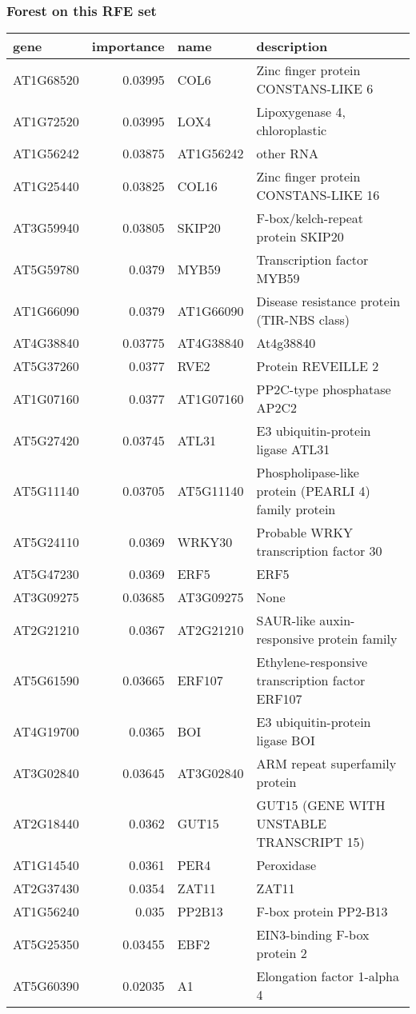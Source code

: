 \documentclass[a4paper]{article}
\begin{document}
\subsubsection{Forest on this RFE set}
\label{sec:org4c0e844}

\begin{center}
\begin{tabular}{lrll}
gene & importance & name & description\\
\hline
AT1G68520 & 0.03995 & COL6 & Zinc finger protein CONSTANS-LIKE 6\\
AT1G72520 & 0.03995 & LOX4 & Lipoxygenase 4, chloroplastic\\
AT1G56242 & 0.03875 & AT1G56242 & other RNA\\
AT1G25440 & 0.03825 & COL16 & Zinc finger protein CONSTANS-LIKE 16\\
AT3G59940 & 0.03805 & SKIP20 & F-box/kelch-repeat protein SKIP20\\
AT5G59780 & 0.0379 & MYB59 & Transcription factor MYB59\\
AT1G66090 & 0.0379 & AT1G66090 & Disease resistance protein (TIR-NBS class)\\
AT4G38840 & 0.03775 & AT4G38840 & At4g38840\\
AT5G37260 & 0.0377 & RVE2 & Protein REVEILLE 2\\
AT1G07160 & 0.0377 & AT1G07160 & PP2C-type phosphatase AP2C2\\
AT5G27420 & 0.03745 & ATL31 & E3 ubiquitin-protein ligase ATL31\\
AT5G11140 & 0.03705 & AT5G11140 & Phospholipase-like protein (PEARLI 4) family protein\\
AT5G24110 & 0.0369 & WRKY30 & Probable WRKY transcription factor 30\\
AT5G47230 & 0.0369 & ERF5 & ERF5\\
AT3G09275 & 0.03685 & AT3G09275 & None\\
AT2G21210 & 0.0367 & AT2G21210 & SAUR-like auxin-responsive protein family\\
AT5G61590 & 0.03665 & ERF107 & Ethylene-responsive transcription factor ERF107\\
AT4G19700 & 0.0365 & BOI & E3 ubiquitin-protein ligase BOI\\
AT3G02840 & 0.03645 & AT3G02840 & ARM repeat superfamily protein\\
AT2G18440 & 0.0362 & GUT15 & GUT15 (GENE WITH UNSTABLE TRANSCRIPT 15)\\
AT1G14540 & 0.0361 & PER4 & Peroxidase\\
AT2G37430 & 0.0354 & ZAT11 & ZAT11\\
AT1G56240 & 0.035 & PP2B13 & F-box protein PP2-B13\\
AT5G25350 & 0.03455 & EBF2 & EIN3-binding F-box protein 2\\
AT5G60390 & 0.02035 & A1 & Elongation factor 1-alpha 4\\
\end{tabular}
\end{center}
\end{document}
